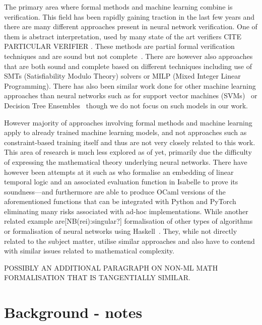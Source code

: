 \documentclass[a4paper,UKenglish,cleveref, autoref, thm-restate]{lipics-v2021}
\def\rei#1{{\color{red}[NB(rei):#1]}}
\begin{document}
The primary area where formal methods and machine learning combine is verification. This field has been rapidly gaining traction in the last few years and there are many different approaches present in neural network verification\cite{urban2021review,9842406}. One of them is abstract interpretation, used by many state of the art verifiers CITE PARTICULAR VERIFIER . These methods are partial formal verification techniques and are sound but not complete~\cite{easterbrook1998formal}. There are however also approaches that are both sound and complete based on different techniques including use of SMTs (Satisfiability Modulo Theory) \cite{katz2019marabou} solvers or MILP (Mixed Integer Linear Programming). There has also been similar work done for other machine learning approaches than neural networks such as for support vector machines (SVMs)~\cite{ranzato2019robustness} or Decision Tree Ensembles~\cite{einziger2019verifying} though we do not focus on such models in our work. 

However majority of approaches involving formal methods and machine learning  apply to already trained machine learning models, and not approaches such as constraint-based training itself and thus are not very closely related to this work. This area of research is much less explored as of yet, primarily due the difficulty of expressing the mathematical theory underlying neural networks. There have however been attempts at it such as \cite{chevallier2022constrained} who formalise an embedding of linear temporal logic and an associated evaluation function in Isabelle to prove its soundness---and furthermore are able to produce OCaml versions of the aforementioned functions that can be integrated with Python and PyTorch eliminating many risks associated with ad-hoc implementations. 
While another related example are\rei{singular?} formalisation of other types of algorithms~\cite{daukantas2021trimming} or formalisation of neural networks using Haskell~\cite{xie2023haskell}. They, while not directly related to the subject matter, utilise similar approaches and also have to contend with similar issues related to mathematical complexity.

POSSIBLY AN ADDITIONAL PARAGRAPH ON NON-ML MATH FORMALISATION THAT IS TANGENTIALLY SIMILAR.



\section{Background - notes}
\end{document}
